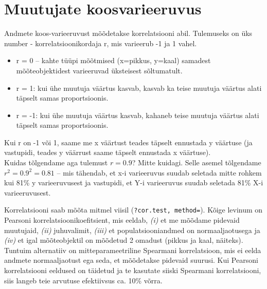 \documentclass[]{book}
\newenvironment{Shaded}{\begin{snugshade}}{\end{snugshade}}
\newcommand{\CommentTok}[1]{\textcolor[rgb]{0.56,0.35,0.01}{\textit{#1}}}
\newcommand{\DataTypeTok}[1]{\textcolor[rgb]{0.13,0.29,0.53}{#1}}
\newcommand{\KeywordTok}[1]{\textcolor[rgb]{0.13,0.29,0.53}{\textbf{#1}}}
\newcommand{\NormalTok}[1]{#1}
\newcommand{\OperatorTok}[1]{\textcolor[rgb]{0.81,0.36,0.00}{\textbf{#1}}}
\newcommand{\StringTok}[1]{\textcolor[rgb]{0.31,0.60,0.02}{#1}}
\providecommand{\tightlist}{%
  \setlength{\itemsep}{0pt}\setlength{\parskip}{0pt}}
\begin{document}
\hypertarget{muutujate-koosvarieeruvus}{%
\section*{Muutujate koosvarieeruvus}\label{muutujate-koosvarieeruvus}}

Andmete koos-varieeruvust mõõdetakse korrelatsiooni abil. Tulemuseks on üks number - korrelatsioonikordaja r, mis varieerub -1 ja 1 vahel.

\begin{itemize}
\tightlist
\item
  r = 0 -- kahte tüüpi mõõtmised (x=pikkus, y=kaal) samadest mõõteobjektidest varieeruvad üksteisest sõltumatult.
\item
  r = 1: kui ühe muutuja väärtus kasvab, kasvab ka teise muutuja väärtus alati täpselt samas proportsioonis.
\item
  r = -1: kui ühe muutuja väärtus kasvab, kahaneb teise muutuja väärtus alati täpselt samas proportsioonis.
\end{itemize}

Kui r on -1 või 1, saame me x väärtust teades täpselt ennustada y väärtuse (ja vastupidi, teades y väärrust saame täpselt ennustada x väärtuse).\\
Kuidas tõlgendame aga tulemust \(r = 0.9\)? Mitte kuidagi. Selle asemel tõlgendame \(r^2 = 0.9^2 = 0.81\) -- mis tähendab, et x-i varieeruvus suudab seletada mitte rohkem kui 81\% y varieeruvusest ja vastupidi, et Y-i varieeruvus suudab seletada 81\% X-i varieeruvusest.

Korrelatsiooni saab mõõta mitmel viisil (\texttt{?cor.test,\ method=}). Kõige levinum on Pearsoni korrelatsioonikoefitsient, mis eeldab, \emph{(i)} et me mõõdame pidevaid muutujaid, \emph{(ii)} juhuvalimit, \emph{(iii)} et populatsiooniandmed on normaaljaotusega ja \emph{(iv)} et igal mõõteobjektil on mõõdetud 2 omadust (pikkus ja kaal, näiteks). Tuntuim alternatiiv on mitteparameetriline Spearmani korrelatsioon, mis ei eelda andmete normaaljaotust ega seda, et mõõdetakse pidevaid suurusi. Kui Pearsoni korrelatsiooni eeldused on täidetud ja te kasutate siiski Spearmani korrelatsiooni, siis langeb teie arvutuse efektiivsus ca. 10\% võrra.

\begin{Shaded}
\end{Shaded}
\end{document}
